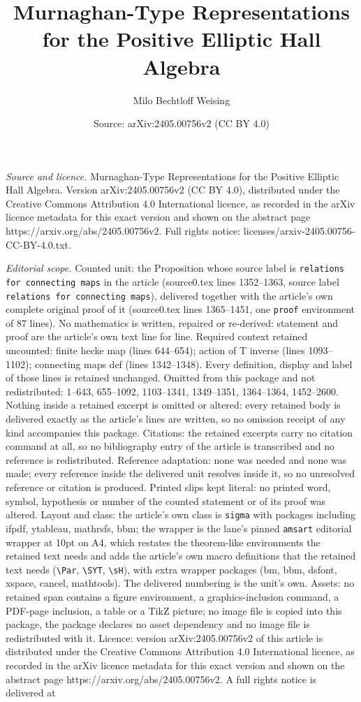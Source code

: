 \documentclass[10pt,a4paper]{amsart}
\title[Murnaghan-Type Representations for the Positive Elliptic Hal]{Murnaghan-Type Representations for the Positive Elliptic Hall Algebra}
\author{Milo Bechtloff Weising}
\date{Source: arXiv:2405.00756v2 (CC BY 4.0)}
\begin{document}
\maketitle

\noindent\emph{Source and licence.} Murnaghan-Type Representations for the Positive Elliptic Hall Algebra. Version arXiv:2405.00756v2 (CC BY 4.0), distributed under the Creative Commons Attribution 4.0 International licence, as recorded in the arXiv licence metadata for this exact version and shown on the abstract page https://arxiv.org/abs/2405.00756v2. Full rights notice: licenses/arxiv-2405.00756-CC-BY-4.0.txt.\par\smallskip

\noindent\textit{Editorial scope.} Counted unit: the Proposition whose source label is \texttt{relations for connecting maps} in the article (source0.tex lines 1352--1363, source label \texttt{relations for connecting maps}), delivered together with the article's own complete original proof of it (source0.tex lines 1365--1451, one \texttt{proof} environment of 87 lines). No mathematics is written, repaired or re-derived: statement and proof are the article's own text line for line. Required context retained uncounted: finite hecke map (lines 644--654); action of T inverse (lines 1093--1102); connecting maps def (lines 1342--1348). Every definition, display and label of those lines is retained unchanged. Omitted from this package and not redistributed: 1--643, 655--1092, 1103--1341, 1349--1351, 1364--1364, 1452--2600. Nothing inside a retained excerpt is omitted or altered: every retained body is delivered exactly as the article's lines are written, so no omission receipt of any kind accompanies this package. Citations: the retained excerpts carry no citation command at all, so no bibliography entry of the article is transcribed and no reference is redistributed. Reference adaptation: none was needed and none was made; every reference inside the delivered unit resolves inside it, so no unresolved reference or citation is produced. Printed slips kept literal: no printed word, symbol, hypothesis or number of the counted statement or of its proof was altered. Layout and class: the article's own class is \texttt{sigma} with packages including ifpdf, ytableau, mathrsfs, bbm; the wrapper is the lane's pinned \texttt{amsart} editorial wrapper at 10pt on A4, which restates the theorem-like environments the retained text needs and adds the article's own macro definitions that the retained text needs (\texttt{\textbackslash Par}, \texttt{\textbackslash SYT}, \texttt{\textbackslash sH}), with extra wrapper packages (bm, bbm, dsfont, xspace, cancel, mathtools). The delivered numbering is the unit's own. Assets: no retained span contains a figure environment, a graphics-inclusion command, a PDF-page inclusion, a table or a TikZ picture; no image file is copied into this package, the package declares no asset dependency and no image file is redistributed with it. Licence: version arXiv:2405.00756v2 of this article is distributed under the Creative Commons Attribution 4.0 International licence, as recorded in the arXiv licence metadata for this exact version and shown on the abstract page https://arxiv.org/abs/2405.00756v2. A full rights notice is delivered at 
\end{document}
